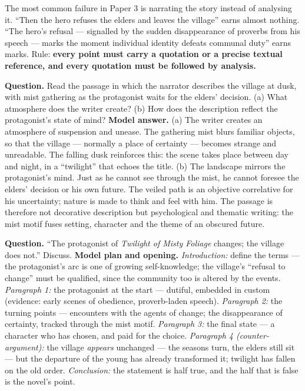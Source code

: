 \documentclass[11pt]{article}
\newcounter{popsec}
\newcounter{popsub}
\newcommand{\courssub}[1]{%
  \stepcounter{popsub}%
  \par\vspace{9pt}\noindent{\popxbold\fontsize{11.5}{13}\selectfont\color{popink}{\color{poporange}\thepopsec.\thepopsub}\hspace{6pt}#1}\par\nopagebreak\vspace{4pt}
}
\begin{document}
\courssub{Answering Context and Essay Questions}

\begin{attention}
The most common failure in Paper 3 is narrating the story instead of analysing it. ``Then the hero refuses the elders and leaves the village'' earns almost nothing. ``The hero's refusal — signalled by the sudden disappearance of proverbs from his speech — marks the moment individual identity defeats communal duty'' earns marks. Rule: \textbf{every point must carry a quotation or a precise textual reference, and every quotation must be followed by analysis.}
\end{attention}

\begin{exoresolu}
\textbf{Question.} Read the passage in which the narrator describes the village at dusk, with mist gathering as the protagonist waits for the elders' decision. (a) What atmosphere does the writer create? (b) How does the description reflect the protagonist's state of mind?
\tcblower
\textbf{Model answer.} (a) The writer creates an atmosphere of suspension and unease. The gathering mist blurs familiar objects, so that the village — normally a place of certainty — becomes strange and unreadable. The falling dusk reinforces this: the scene takes place between day and night, in a ``twilight'' that echoes the title. (b) The landscape mirrors the protagonist's mind. Just as he cannot see through the mist, he cannot foresee the elders' decision or his own future. The veiled path is an objective correlative for his uncertainty; nature is made to think and feel with him. The passage is therefore not decorative description but psychological and thematic writing: the mist motif fuses setting, character and the theme of an obscured future.
\end{exoresolu}

\begin{exoresolu}
\textbf{Question.} ``The protagonist of \emph{Twilight of Misty Foliage} changes; the village does not.'' Discuss.
\tcblower
\textbf{Model plan and opening.} \emph{Introduction:} define the terms — the protagonist's arc is one of growing self-knowledge; the village's ``refusal to change'' must be qualified, since the community too is altered by the events. \emph{Paragraph 1:} the protagonist at the start — dutiful, embedded in custom (evidence: early scenes of obedience, proverb-laden speech). \emph{Paragraph 2:} the turning points — encounters with the agents of change; the disappearance of certainty, tracked through the mist motif. \emph{Paragraph 3:} the final state — a character who has chosen, and paid for the choice. \emph{Paragraph 4 (counter-argument):} the village \emph{appears} unchanged — the seasons turn, the elders still sit — but the departure of the young has already transformed it; twilight has fallen on the old order. \emph{Conclusion:} the statement is half true, and the half that is false is the novel's point.
\end{exoresolu}
\end{document}
